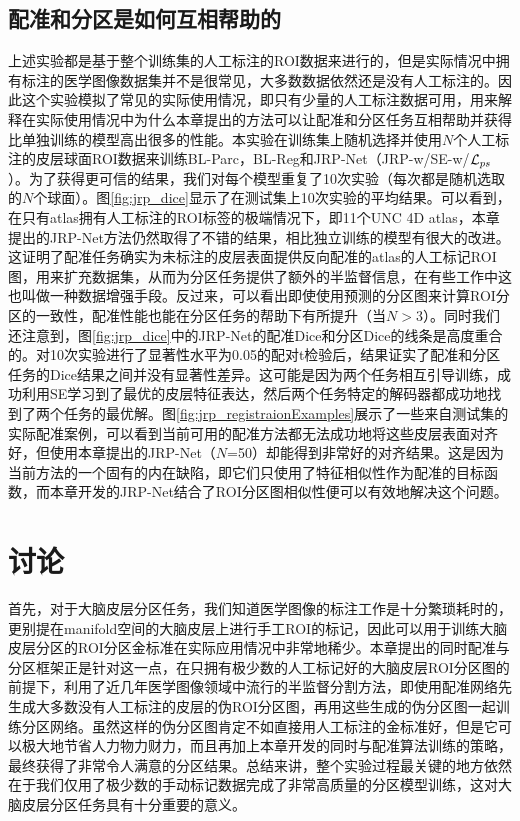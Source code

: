 \subsection{配准和分区是如何互相帮助的}
上述实验都是基于整个训练集的人工标注的ROI数据来进行的，但是实际情况中拥有标注的医学图像数据集并不是很常见，大多数数据依然还是没有人工标注的。因此这个实验模拟了常见的实际使用情况，即只有少量的人工标注数据可用，用来解释在实际使用情况中为什么本章提出的方法可以让配准和分区任务互相帮助并获得比单独训练的模型高出很多的性能。本实验在训练集上随机选择并使用$N$个人工标注的皮层球面ROI数据来训练BL-Parc，BL-Reg和JRP-Net（JRP-w/SE-w/${\cal L}_{ps}$）。为了获得更可信的结果，我们对每个模型重复了10次实验（每次都是随机选取的$N$个球面）。图\ref{fig:jrp_dice}显示了在测试集上10次实验的平均结果。可以看到，在只有atlas拥有人工标注的ROI标签的极端情况下，即11个UNC 4D atlas\cite{li2015construction}，本章提出的JRP-Net方法仍然取得了不错的结果，相比独立训练的模型有很大的改进。这证明了配准任务确实为未标注的皮层表面提供反向配准的atlas的人工标记ROI图，用来扩充数据集，从而为分区任务提供了额外的半监督信息，在有些工作\cite{xu2019deepatlas}中这也叫做一种数据增强手段。反过来，可以看出即使使用预测的分区图来计算ROI分区的一致性，配准性能也能在分区任务的帮助下有所提升（当$N>3$）。同时我们还注意到，图\ref{fig:jrp_dice}中的JRP-Net的配准Dice和分区Dice的线条是高度重合的。对10次实验进行了显著性水平为0.05的配对t检验后，结果证实了配准和分区任务的Dice结果之间并没有显著性差异。这可能是因为两个任务相互引导训练，成功利用SE学习到了最优的皮层特征表达，然后两个任务特定的解码器都成功地找到了两个任务的最优解。图\ref{fig:jrp_registraionExamples}展示了一些来自测试集的实际配准案例，可以看到当前可用的配准方法都无法成功地将这些皮层表面对齐好，但使用本章提出的JRP-Net（$N$=50）却能得到非常好的对齐结果。这是因为当前方法的一个固有的内在缺陷，即它们只使用了特征相似性作为配准的目标函数，而本章开发的JRP-Net结合了ROI分区图相似性便可以有效地解决这个问题。

\section{讨论}
首先，对于大脑皮层分区任务，我们知道医学图像的标注工作是十分繁琐耗时的，更别提在manifold空间的大脑皮层上进行手工ROI的标记，因此可以用于训练大脑皮层分区的ROI分区金标准在实际应用情况中非常地稀少。本章提出的同时配准与分区框架正是针对这一点，在只拥有极少数的人工标记好的大脑皮层ROI分区图的前提下，利用了近几年医学图像领域中流行的半监督分割方法，即使用配准网络先生成大多数没有人工标注的皮层的伪ROI分区图，再用这些生成的伪分区图一起训练分区网络。虽然这样的伪分区图肯定不如直接用人工标注的金标准好，但是它可以极大地节省人力物力财力，而且再加上本章开发的同时与配准算法训练的策略，最终获得了非常令人满意的分区结果。总结来讲，整个实验过程最关键的地方依然在于我们仅用了极少数的手动标记数据完成了非常高质量的分区模型训练，这对大脑皮层分区任务具有十分重要的意义。

